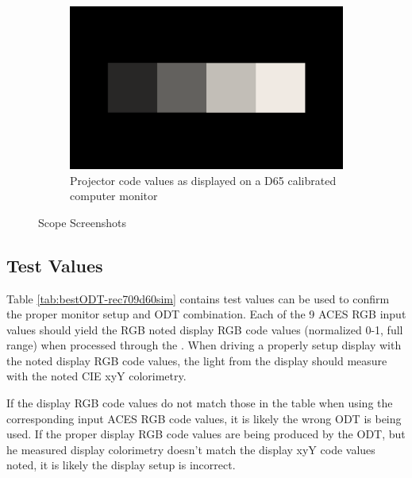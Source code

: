 \begin{figure}[ht!]
\begin{subfigure}[b]{0.475\textwidth}
            \includegraphics[width=\textwidth]{images/rec709_d60sim/rec709_d60sim_image}
            \caption[Projector code values as displayed on a D65 calibrated computer monitor]%
            {{\small Projector code values as displayed on a D65 calibrated computer monitor}}    
            \label{fig:cv-rec709_d60sim}
        \end{subfigure}
        \caption[]
        {\small \texttt{} Scope Screenshots} 
        \label{fig:screenshots-rec709_d60sim}
    \end{figure}


\subsection{Test Values}
\label{subsec:testValues-rec709d60sim}

Table \ref{tab:bestODT-rec709d60sim} contains test values can be used to confirm the proper monitor setup and ODT combination.  Each of the 9 ACES RGB input values should yield the RGB noted display RGB code values (normalized 0-1, full range) when processed through the \texttt{}. When driving a properly setup display with the noted display RGB code values, the light from the display should measure with the noted CIE xyY colorimetry.  

If the display RGB code values do not match those in the table when using the corresponding input ACES RGB code values, it is likely the wrong ODT is being used.  If the proper display RGB code values are being produced by the ODT, but he measured display colorimetry doesn't match the display xyY code values noted, it is likely the display setup is incorrect.

